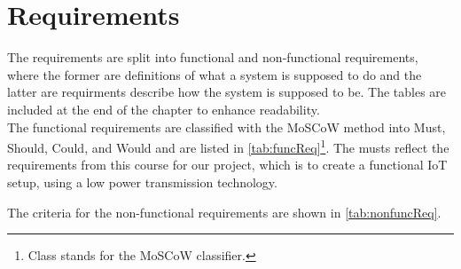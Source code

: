 \section{Requirements}
The requirements are split into functional and non-functional requirements, where the former are definitions of what a system is supposed to do and the latter are requirments describe how the system is supposed to be. The tables are included at the end of the chapter to enhance readability.\\
The functional requirements are classified with the MoSCoW method into Must, Should, Could, and Would and are listed in \cref{tab:funcReq}\footnote{Class stands for the MoSCoW classifier.}. The musts reflect the requirements from this course for our project, which is to create a functional IoT setup, using a low power transmission technology.

The criteria for the non-functional requirements are shown in \cref{tab:nonfuncReq}.

